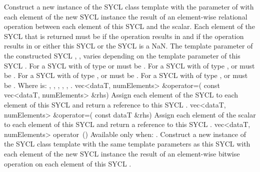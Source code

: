     {
      Construct a new instance of the SYCL  class template with the  parameter of  with each element of the new SYCL  instance the result of an element-wise  relational operation between each element of this SYCL  and the  scalar. Each element of the SYCL  that is returned must be  if the operation results in  and  if the operation results in  or either this SYCL  or the  SYCL  is a NaN.
      \newline \newline
      The  template parameter of the constructed SYCL , , varies depending on the  template parameter of this SYCL . For a SYCL  with  of type  or   must be . For a SYCL  with  of type ,  or   must be . For a SYCL  with  of type ,  or   must be . For a SYCL  with  of type ,  or   must be .
      \newline \newline
      Where  is: \codeinline{==}, \codeinline{!=}, \codeinline{<}, \codeinline{>}, \codeinline{<=}, \codeinline{>=}. 
    }
  \addRowTwoL
    {vec<dataT, numElements> \&operator=(}
    {  const vec<dataT, numElements> \&rhs)}
    {
      Assign each element of the  SYCL  to each element of this SYCL  and return a reference to this SYCL .
    }
  \addRowTwoL
    {vec<dataT, numElements> \&operator=(}
    {  const dataT \&rhs)}
    {
      Assign each element of the  scalar to each element of this SYCL  and return a reference to this SYCL .
    }
  \addRow
  {vec<dataT, numElements> operator~()}
  {
    Available only when: .
    \newline
    Construct a new instance of the SYCL  class template with the same template parameters as this SYCL  with each element of the new SYCL  instance the result of an element-wise  bitwise operation on each element of this SYCL .
  }
